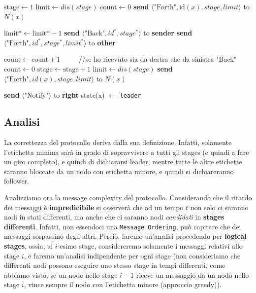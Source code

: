 \newpage

\begin{algorithm}
\caption{Stage Technique}
\begin{algorithmic}[1]

    \Statex
        \State $\text{stage} \gets 1$
        \State $\text{limit} \gets dis(stage)$
        \State $\text{count} \gets 0$
        \State \textbf{send} $\langle \text{"Forth"}, \text{id}(x), stage, limit\rangle$ to $N(x)$
    \EndProcedure

    \Statex
        \State $\text{limit*} \gets \text{limit*} - 1$
            \State \textbf{send} $\langle \text{"Back"}, id^*, stage^*\rangle$ to \textbf{sender}
        \Else
            \State \textbf{send} $\langle \text{"Forth"}, id^*, stage^*, limit^* \rangle$ to \textbf{other}
        \EndIf
    \EndProcedure

    \Statex
        \State $\text{count} \gets \text{count} + 1$
         $\qquad$ //se ho ricevuto sia da destra che da sinistra "Back"
            \State $\text{count} \gets 0$
            \State $\text{stage} \gets \text{stage} + 1$
            \State $\text{limit} \gets dis(stage)$
            \State \textbf{send} $\langle \text{"Forth"}, id(x), stage, limit\rangle$ to $N(x)$
        \EndIf
    \EndProcedure

    \Statex
        \State \textbf{send} $\langle \text{"Notify"}\rangle$ to \textbf{right}
        \State state(x) $\gets$ \texttt{leader}
    \EndProcedure
\end{algorithmic}
\end{algorithm}

\subsection{Analisi}

La correttezza del protocollo deriva dalla sua definizione. Infatti, solamente l'etichetta minima sarà in grado di sopravvivere a tutti gli stages (e quindi a fare un giro completo), e quindi di dichiararsi leader, mentre tutte le altre etichette saranno bloccate da un nodo con etichetta minore, e quindi si dichiareranno follower.

Analizziamo ora la message complexity del protocollo. Considerando che il ritardo dei messaggi è \textbf{impredicibile} si osserverà che ad un tempo $t$ non solo ci saranno nodi in stati differenti, ma anche che ci saranno nodi \textit{candidati} in \textbf{stages differenti}. Infatti, non essendoci una \texttt{Message Ordering}, può capitare che dei messaggi sorpassino degli altri. Perciò, faremo un'analisi procedendo per \textbf{logical stages}, ossia, al $i$-esimo stage, considereremo solamente i messaggi relativi allo stage $i$, e faremo un'analisi indipendente per ogni stage (non consideriamo che differenti nodi possono eseguire uno stesso stage in tempi differenti, come abbiamo visto, se un nodo nello stage $i-1$ riceve un messaggio da un nodo nello stage $i$, vince sempre il nodo con l'etichetta minore (approccio greedy)).

